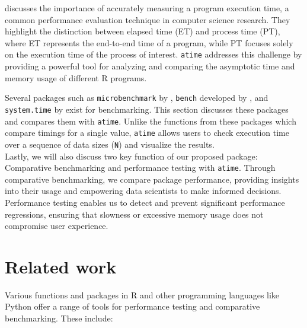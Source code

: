 \noindent \cite{suh2017emp} discusses the importance of accurately measuring a program execution time, a common performance evaluation technique in computer science research. They highlight the distinction between elapsed time (ET) and process time (PT), where ET represents the end-to-end time of a program, while PT focuses solely on the execution time of the process of interest. \texttt{atime} addresses this challenge by providing a powerful tool for analyzing and comparing the asymptotic time and memory usage of different R programs.

\noindent Several packages such as \texttt{microbenchmark} by \cite{microbenchmark}, \texttt{bench} developed by \cite{bench}, and \texttt{system.time} by \cite{system.time} exist for benchmarking. This section discusses these packages and compares them with \texttt{atime}. Unlike the functions from these packages which compare timings for a single value, \texttt{atime} allows users to check execution time over a sequence of data sizes (\texttt{N}) and visualize the results.\\ 

\noindent Lastly, we will also discuss two key function of our proposed package: Comparative benchmarking and performance testing with \texttt{atime}. Through comparative benchmarking, we compare package performance, providing insights into their usage and empowering data scientists to make informed decisions. Performance testing enables us to detect and prevent significant performance regressions, ensuring that slowness or excessive memory usage does not compromise user experience.\\

\section{Related work}

\noindent Various functions and packages in R and other programming languages like Python offer a range of tools for performance testing and comparative benchmarking. These include: 
\\

